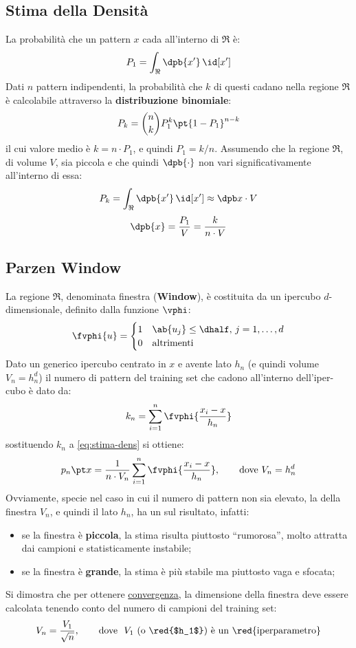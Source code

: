 \subsection{Stima della Densità}\label{sec:stima_della_densita} %
La probabilità che un pattern $x$ cada all'interno di $\Re$ è:
\[
    P_1 = \int_{\Re}{\dpb{x'}\,\id[x']}
\]
Dati $n$ pattern indipendenti, la probabilità che $k$ di questi cadano nella regione $\Re$ è calcolabile attraverso la \textbf{distribuzione binomiale}:
\[
    P_k = \binom{n}{k}P_1^k\pt{1 - P_1}^{n-k}
\]
il cui valore medio è $k = n \cdot P_1$, e quindi $P_1 = k / n$.
\emptyln{}
Assumendo che la regione $\Re$, di volume $V$, sia piccola e che quindi $\dpb{\cdot}$ non vari significativamente all'interno di essa:
\[
    P_k = \int_{\Re}\dpb{x'}\,\id[x'] \approx \dpb x \cdot V
\]
\begin{equation}\label{eq:stima-dens}
    \dpb{x} = \dfrac{P_1}{V} = \dfrac{k}{n \cdot V}
\end{equation}
%
%
\subsection{Parzen Window}\label{sec:parzen_window} %
La regione $\Re$, denominata finestra (\textbf{Window}), è costituita da un ipercubo $d$-dimensionale, definito dalla funzione $\vphi$:
\[
    \fvphi{u} = \begin{cases}
        1 & \ab{u_j} \le \dhalf,\, j = 1, \dots, d \\
        0 & \text{altrimenti}
    \end{cases}
\]
Dato un generico ipercubo centrato in $x$ e avente lato $h_n$ (e quindi volume $V_n = h_n^d$) il numero di pattern del training set che cadono all'interno dell'iper-cubo è dato da:
\[
    k_n = \sum_{i = 1}^n{\fvphi{\frac{x_i - x}{h_n}}}
\]
sostituendo $k_n$ a \cref{eq:stima-dens} si ottiene:
\[
    p_n\pt x = \dfrac{1}{n\cdot V_n}\sum_{i = 1}^n{\fvphi{\frac{x_i - x}{h_n}}},
    \qquad
    \text{dove } V_n = h_n^d
\]
Ovviamente, specie nel caso in cui il numero di pattern non sia elevato, la  della finestra $V_n$, e quindi il lato $h_n$, ha un  sul risultato, infatti:
\begin{itemize}
    \item se la finestra è \textbf{piccola}, la stima risulta piuttosto ``rumorosa'', molto attratta dai campioni e statisticamente instabile;
    \item se la finestra è \textbf{grande}, la stima è più stabile ma piuttosto vaga e sfocata;
\end{itemize}
Si dimostra che per ottenere \hyperref[sub:convergenza]{convergenza}, la dimensione della finestra deve essere calcolata tenendo conto del numero di campioni del training set:
\[
    V_n = \frac{V_1}{\sqrt{n}},
    \qquad
    \text{dove }\ V_1 \text{ (o \red{$h_1$}) è un \red{iperparametro}}
\]
%
